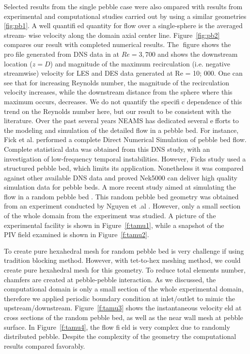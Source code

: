 Selected results from the single pebble case were also ompared with results from experimental and computational studies carried out by using a similar geometries \ref{fig:pb1}. A well quantified quantity for flow over a single-sphere is the averaged stream- wise velocity along the domain axial center line. Figure~\ref{fig:pb2} compares our result with completed numerical results. The figure shows the profile generated from DNS data in \cite{fick2017investigation} at $Re = 3,700$ and shows the downstream location ($z=D$) and magnitude of the maximum recirculation (i.e. negative streamwise) velocity for LES and DES data generated at Re = 10; 000. One can see that for increasing Reynolds number, the magnitude of the recirculation velocity increases, while the downstream distance from the sphere where this maximum occurs, decreases. We do not quantify the specific dependence of this trend on the Reynolds number here, but our result to be consistent with the literature.
Over the past several years NEAMS has dedicated several efforts to the modeling and simulation of the detailed flow in a pebble bed. For instance, Fick et al. \cite{fick2017direct}  performed a complete Direct Numerical Simulation of pebble bed flow. Complete statistical data was obtained from this DNS study, with an investigation of low-frequency temporal instabilities. However, Ficks study \cite{fick2017direct} used a structured pebble bed, which limits its application. Nonetheless it was compared against other available DNS data and proved Nek5000 can deliver high quality simulation data for pebble beds. A more recent study aimed at simulating the flow in a random pebble bed \cite{yildiz2020direct}. This random pebble bed geometry was obtained from an experiment conducted by Nguyen et .al \cite{nguyen2018time}. However, only a small section of the whole domain from the experiment was studied. A picture of the experimental facility is shown in Figure~\ref{f:tamu1}, while a snapshot of the PIVfield examined is shown in Figure~\ref{f:tamu2}.

To create pure hexahedral mesh for random pebble bed is very challenge if using tradition blocking method. However, with tet-to-hex meshing method, we could create pure hexahedral mesh for this geometry. To reduce total elements number, chamfers are created at pebble-pebble interaction. As we discussed, the computational domain is only a small section of the whole experimental domain, therefore we applied periodic boundary condition at inlet/outlet to mimic the upstream/downstream. Figure~\ref{f:tamu3} shows the instantaneous velocityeld at cross sections of the random pebble bed, as well as the near wall mesh at pebble surface. In Figure~\ref{f:tamu4}, the flow field is very complex due to randomly distributed pebble. Despite the complexity of the geometry  the computational results compared favorably.

